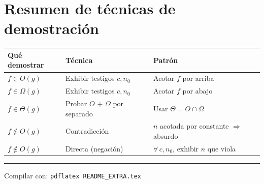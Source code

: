 \documentclass[11pt, letterpaper]{article}
\theoremstyle{definition}
\theoremstyle{plain}
\theoremstyle{remark}
\begin{document}
\section{Resumen de técnicas de demostración}

\begin{center}
\begin{tabular}{lll}
  \toprule
  \textbf{Qué demostrar} & \textbf{Técnica} & \textbf{Patrón} \\
  \midrule
  $f \in O(g)$
    & Exhibir testigos $c, n_0$
    & Acotar $f$ por arriba \\
  $f \in \Omega(g)$
    & Exhibir testigos $c, n_0$
    & Acotar $f$ por abajo \\
  $f \in \Theta(g)$
    & Probar $O$ $+$ $\Omega$ por separado
    & Usar $\Theta = O \cap \Omega$ \\
  $f \notin O(g)$
    & Contradicción
    & $n$ acotada por constante $\Rightarrow$ absurdo \\
  $f \notin O(g)$
    & Directa (negación)
    & $\forall\, c, n_0$, exhibir $n$ que viola \\
  \bottomrule
\end{tabular}
\end{center}

\bigskip\hrule\bigskip

\begin{center}
  \small
  Compilar con: \texttt{pdflatex README\_EXTRA.tex}
\end{center}
\end{document}
